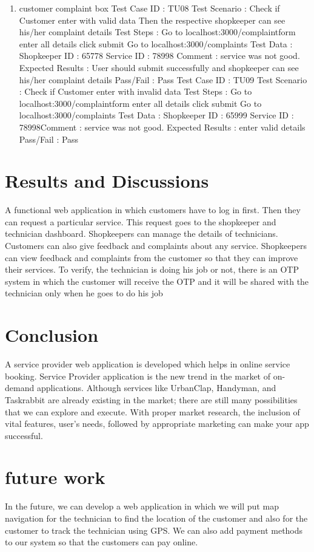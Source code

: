 \documentclass[conference]{IEEEtran}
\begin{document}
\begin{enumerate}
\item customer complaint box
Test Case ID : TU08
Test Scenario : Check if Customer enter with valid data
Then the respective shopkeeper can see his/her complaint
details
Test Steps : Go to localhost:3000/complaintform
enter all details
click submit
Go to localhost:3000/complaints
Test Data : Shopkeeper ID : 65778
Service ID : 78998
Comment : service was not good.
Expected Results : User should submit successfully and
shopkeeper can see his/her complaint details
Pass/Fail : Pass
Test Case ID : TU09
Test Scenario : Check if Customer enter with invalid data
Test Steps : Go to localhost:3000/complaintform
enter all details
click submit
Go to localhost:3000/complaints
Test Data : Shopkeeper ID : 65999
Service ID : 78998Comment : service was not good.
Expected Results : enter valid details
Pass/Fail : Pass

\end{enumerate}

\section{Results and Discussions}
A functional web application in which customers have to log
in first. Then they can request a particular service. This
request goes to the shopkeeper and technician dashboard.
Shopkeepers can manage the details of technicians.
Customers can also give feedback and complaints about any
service. Shopkeepers can view feedback and complaints
from the customer so that they can improve their services.
To verify, the technician is doing his job or not, there is an
OTP system in which the customer will receive the OTP and
it will be shared with the technician only when he goes to do
his job

\section{Conclusion}
A service provider web application is developed which helps
in online service booking. Service Provider application is the
new trend in the market of on-demand applications. Although
services like UrbanClap, Handyman, and Taskrabbit are
already existing in the market; there are still many
possibilities that we can explore and execute. With proper
market research, the inclusion of vital features, user’s needs,
followed by appropriate marketing can make your app
successful.

\section{future work}
In the future, we can develop a web application in which we
will put map navigation for the technician to find the location
of the customer and also for the customer to track the
technician using GPS. We can also add payment methods to
our system so that the customers can pay online.
\end{document}
